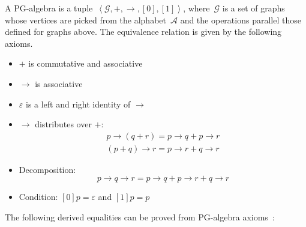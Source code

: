 A PG-algebra is a tuple~$\left\langle \mathcal{G},+,\rightarrow,[0],[1]\right\rangle $,
where~$\mathcal{G}$ is a set of graphs whose vertices are picked
from the alphabet~$\mathcal{A}$ and the operations parallel those
defined for graphs above. The equivalence relation is given by the
following axioms.
\begin{itemize}
\item $+$ is commutative and associative
\item $\rightarrow$ is associative
\item $\varepsilon$ is a left and right identity of $\rightarrow$
\item $\rightarrow$ distributes over $+$:\vspace{-0.3em}
\[
\begin{array}{c}
p\rightarrow(q+r)=p\rightarrow q+p\rightarrow r\\
(p+q)\rightarrow r=p\rightarrow r+q\rightarrow r
\end{array}
\]

\item Decomposition: \vspace{-0.3em}
\[
p\rightarrow q\rightarrow r=p\rightarrow q+p\rightarrow r+q\rightarrow r
\]

\item Condition: $[0]p=\varepsilon$ and $[1]p=p$
\end{itemize}
The following derived equalities can be proved from PG-algebra axioms~\cite[Prop. 2, 3]{2011_mokhov_pg}:
